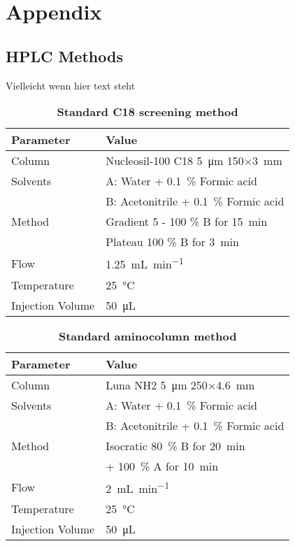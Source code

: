 \appendix
\chapter{Appendix}

\section{HPLC Methods} %
\label{sec:hplc_methods}

	Vielleicht wenn hier text steht

	\begin{table}[htbp]
		\caption[Standard C18 screening method]{\textbf{Standard C18 screening method}}
		\label{tab:method_c18_screening}
		\centering
		\begin{tabularx}{\textwidth}{XX}
			\toprule
			\textbf{Parameter}	& \textbf{Value}	\\
			\midrule
			Column 		& Nucleosil-100 C18 \SI{5}{\micro\meter} 150$\times$\SI{3}{\milli\meter} 	\\
			Solvents	& A: Water + 0.1~\% Formic acid 	\\
						& B: Acetonitrile + 0.1~\% Formic acid		\\
			Method 		& Gradient 5 - 100 \% B for \SI{15}{\minute} 	\\
						& Plateau 100 \% B for \SI{3}{\minute} 	\\
			Flow 		& \SI{1.25}{\milli\liter\per\minute} \\
			Temperature & \SI{25}{\celsius} 	\\
			Injection Volume 	& \SI{50}{\micro\liter} 	\\
			\bottomrule
		\end{tabularx}
	\end{table}

	\begin{table}[htbp]
		\caption[Standard aminocolumn method]{\textbf{Standard aminocolumn method}}
		\label{tab:method_nh2_standard}
		\centering
		\begin{tabularx}{\textwidth}{XX}
			\toprule
			\textbf{Parameter}	& \textbf{Value}	\\
			\midrule
			Column 		& Luna NH2 \SI{5}{\micro\meter} 250$\times$\SI{4.6}{\milli\meter} 	\\
			Solvents	& A: Water + 0.1~\% Formic acid 	\\
						& B: Acetonitrile + 0.1~\% Formic acid		\\
			Method 		& Isocratic 80~\% B for \SI{20}{\minute} 	\\
						& + 100~\% A for \SI{10}{\minute}   \\
			Flow 		& \SI{2}{\milli\liter\per\minute} \\
			Temperature & \SI{25}{\celsius} 	\\
			Injection Volume 	& \SI{50}{\micro\liter} 	\\
			\bottomrule
		\end{tabularx}
	\end{table}

